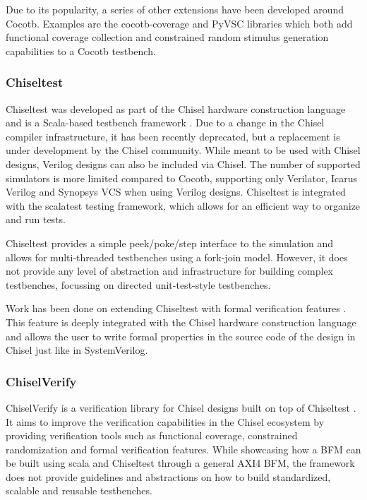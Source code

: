 Due to its popularity, a series of other extensions have been developed around Cocotb. Examples are the
cocotb-coverage \cite{crvpython} and PyVSC \cite{pyvsc} libraries which both add functional coverage collection and
constrained random stimulus generation capabilities to a Cocotb testbench.

\subsubsection{Chiseltest} %

Chiseltest was developed as part of the Chisel hardware construction language \cite{chiselpaper} and is a Scala-based testbench
framework \cite{chiseltest}. Due to a change in the Chisel compiler infrastructure, it has been recently deprecated,
but a replacement is under development by the Chisel community. While meant to be used with Chisel designs, Verilog
designs can also be included via Chisel. The number of supported simulators is more limited compared to Cocotb,
supporting only Verilator, Icarus Verilog and Synopsys VCS when using Verilog designs. Chiseltest is integrated with
the scalatest testing framework, which allows for an efficient way to organize and run tests.

Chiseltest provides a simple peek/poke/step interface to the simulation and allows for multi-threaded testbenches
using a fork-join model. However, it does not provide any
level of abstraction and infrastructure for building complex
testbenches, focussing on directed unit-test-style testbenches.

Work has been done on extending Chiseltest with formal verification features \cite{laeufer2021open}. This feature is
deeply integrated with the Chisel hardware construction language and allows the user to write formal properties in
the source code of the design in Chisel just like in SystemVerilog.

\subsubsection{ChiselVerify} %

ChiselVerify is a verification library for Chisel designs built on top of Chiseltest \cite{chiselverify}. It aims to
improve the verification capabilities in the Chisel ecosystem by providing verification tools such as functional
coverage, constrained randomization and formal verification features. While showcasing how a BFM can be built using
scala and Chiseltest through a general AXI4 BFM, the framework does not provide guidelines and abstractions on how to
build standardized, scalable and reusable testbenches.

